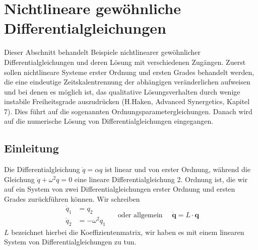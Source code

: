 \chapter{Nichtlineare gewöhnliche Differentialgleichungen}
Dieser Abschnitt behandelt Beispiele nichtlinearer gewöhnlicher
Differentialgleichungen und deren Lösung mit verschiedenen Zugängen. Zuerst
sollen nichtlineare Systeme erster Ordnung und ersten Grades behandelt werden,
die eine eindeutige Zeitskalentrennung der abhängigen veränderlichen aufweisen
und bei denen es möglich ist, das qualitative Lösungsverhalten durch wenige
instabile Freiheitsgrade auszudrücken ({\red H.Haken, Advanced Synergetics,
Kapitel 7}). Dies führt auf die sogenannten Ordnungsparametergleichungen.
Danach wird auf die numerische Lösung von Differentialgleichungen eingegangen.
\section{Einleitung}
Die Differentialgleichung $\dot q=\alpha q$ ist linear und von erster Ordnung,
während die Gleichung $\ddot q+\omega^2 q=0$ eine lineare Differentialgleichung
2. Ordnung ist, die wir auf ein System von zwei Differentialgleichungen erster
Ordnung und ersten Grades zurückführen können. Wir schreiben
\[
  \begin{matrix}\dot q_1&=q_2\\ \dot q_2&= -\omega^2 q_1 \end{matrix} 
  \quad\text{ oder allgemein }\quad\dot{\mathbf{q}}=L\cdot\mathbf{q}
\]
$L$ bezeichnet hierbei die Koeffizientenmatrix, wir haben es mit einem linearen
System von Differentialgleichungen zu tun.

